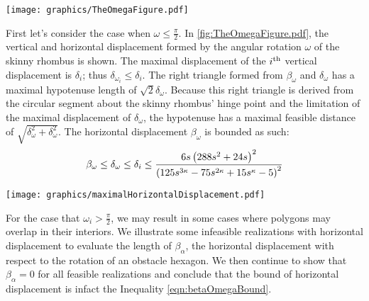 \begin{minipage}{\linewidth}
\begin{center}
\texttt{[image: graphics/TheOmegaFigure.pdf]}
\label{fig:TheOmegaFigure.pdf}
\end{center}
\end{minipage}

First let's consider the case when $\omega \leq \frac{\pi}{2}$.
In \ref{fig:TheOmegaFigure.pdf}, the vertical and horizontal displacement formed by the angular rotation $\omega$ of the skinny rhombus is shown. 
The maximal displacement of the $i^\text{th}$ vertical displacement is $\delta_i$; thus $\delta_{\omega_i} \leq \delta_i$.  
The right triangle formed from $\beta_\omega$ and $\delta_\omega$ has a maximal hypotenuse length of $\sqrt{2}\delta_\omega$.  
Because this right triangle is derived from the circular segment about the skinny rhombus' hinge point and the limitation of the maximal displacement of $\delta_\omega$, the hypotenuse has a maximal feasible distance of $\sqrt{\delta_\omega^2 + \delta_\omega^2}$.
The horizontal displacement $\beta_\omega$ is bounded as such:
\begin{equation}\label{eqn:betaOmegaBound}
\beta_\omega \leq \delta_\omega \leq \delta_i \leq \frac{6s\left( 288s^2+24s \right)^2}{\left( 125 s^{3\kappa}-75 s^{2\kappa}+15 s^\kappa-5 \right)^2}
\end{equation}

\begin{minipage}{\linewidth}
\begin{center}
\texttt{[image: graphics/maximalHorizontalDisplacement.pdf]}
\label{fig:maximalHorizontalDisplacement.pdf}
\end{center}
\end{minipage}

For the case that $\omega_i > \frac{\pi}{2}$, we may result in some cases where polygons may overlap in their interiors. 
We illustrate some infeasible realizations with horizontal displacement to evaluate the length of $\beta_\alpha$, the horizontal displacement with respect to the rotation of an obstacle hexagon.  
We then continue to show that $\beta_\alpha = 0$ for all feasible realizations and conclude that the bound of horizontal displacement is infact the Inequality \ref{eqn:betaOmegaBound}. 

